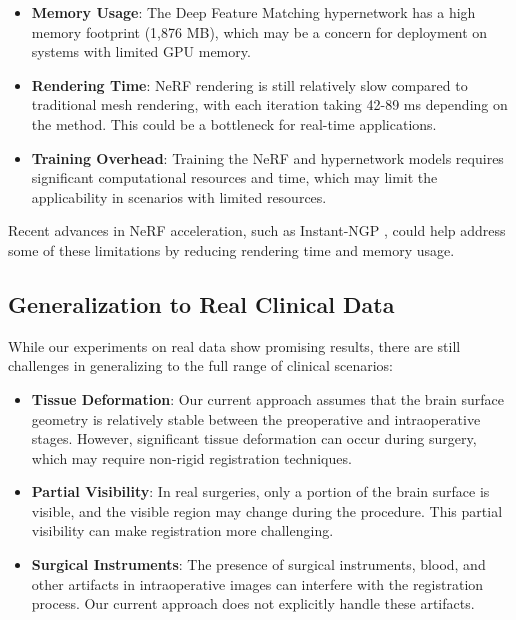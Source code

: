 \begin{itemize}
    \item \textbf{Memory Usage}: The Deep Feature Matching hypernetwork has a high memory footprint (1,876 MB), which may be a concern for deployment on systems with limited GPU memory.
    
    \item \textbf{Rendering Time}: NeRF rendering is still relatively slow compared to traditional mesh rendering, with each iteration taking 42-89 ms depending on the method. This could be a bottleneck for real-time applications.
    
    \item \textbf{Training Overhead}: Training the NeRF and hypernetwork models requires significant computational resources and time, which may limit the applicability in scenarios with limited resources.
\end{itemize}

Recent advances in NeRF acceleration, such as Instant-NGP \cite{muller2022instant}, could help address some of these limitations by reducing rendering time and memory usage.

\subsection{Generalization to Real Clinical Data}
While our experiments on real data show promising results, there are still challenges in generalizing to the full range of clinical scenarios:

\begin{itemize}
    \item \textbf{Tissue Deformation}: Our current approach assumes that the brain surface geometry is relatively stable between the preoperative and intraoperative stages. However, significant tissue deformation can occur during surgery, which may require non-rigid registration techniques.
    
    \item \textbf{Partial Visibility}: In real surgeries, only a portion of the brain surface is visible, and the visible region may change during the procedure. This partial visibility can make registration more challenging.
    
    \item \textbf{Surgical Instruments}: The presence of surgical instruments, blood, and other artifacts in intraoperative images can interfere with the registration process. Our current approach does not explicitly handle these artifacts.
\end{itemize}

